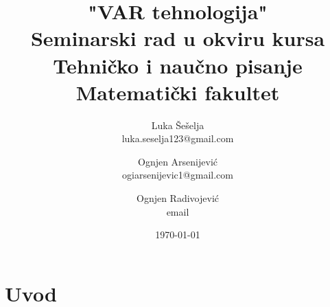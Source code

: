 \documentclass[12pt,a4paper]{article}
\begin{document}
\title{"VAR tehnologija"\\ \small{Seminarski rad u okviru kursa\\Tehničko i naučno pisanje\\ Matematički fakultet}}

\author{Luka Šešelja\\ luka.seselja123@gmail.com \and Ognjen Arsenijević\\ ogiarsenijevic1@gmail.com \and Ognjen Radivojević\\ email}
\date{\today}
\maketitle

\begin{abstract}
    
\end{abstract}

\tableofcontents

\newpage

\section{Uvod}
\label{sec:uvod}
\end{document}
